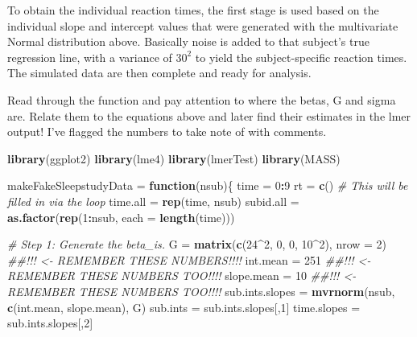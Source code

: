\documentclass[
]{book}
\newenvironment{Shaded}{\begin{snugshade}}{\end{snugshade}}
\newcommand{\CommentTok}[1]{\textcolor[rgb]{0.56,0.35,0.01}{\textit{#1}}}
\newcommand{\ControlFlowTok}[1]{\textcolor[rgb]{0.13,0.29,0.53}{\textbf{#1}}}
\newcommand{\DataTypeTok}[1]{\textcolor[rgb]{0.13,0.29,0.53}{#1}}
\newcommand{\DecValTok}[1]{\textcolor[rgb]{0.00,0.00,0.81}{#1}}
\newcommand{\KeywordTok}[1]{\textcolor[rgb]{0.13,0.29,0.53}{\textbf{#1}}}
\newcommand{\NormalTok}[1]{#1}
\newcommand{\OperatorTok}[1]{\textcolor[rgb]{0.81,0.36,0.00}{\textbf{#1}}}
\newcommand{\StringTok}[1]{\textcolor[rgb]{0.31,0.60,0.02}{#1}}
\begin{document}
To obtain the individual reaction times, the first stage is used based on the individual slope and intercept values that were generated with the multivariate Normal distribution above. Basically noise is added to that subject's true regression line, with a variance of \(30^2\) to yield the subject-specific reaction times. The simulated data are then complete and ready for analysis.

Read through the function and pay attention to where the betas, G and sigma are. Relate them to the equations above and later find their estimates in the lmer output! I've flagged the numbers to take note of with comments.

\begin{Shaded}
\begin{Highlighting}[]
\KeywordTok{library}\NormalTok{(ggplot2)}
\KeywordTok{library}\NormalTok{(lme4)}
\KeywordTok{library}\NormalTok{(lmerTest)}
\KeywordTok{library}\NormalTok{(MASS)}

\NormalTok{makeFakeSleepstudyData =}\StringTok{ }\ControlFlowTok{function}\NormalTok{(nsub)\{}
\NormalTok{  time =}\StringTok{ }\DecValTok{0}\OperatorTok{:}\DecValTok{9}
\NormalTok{  rt =}\StringTok{ }\KeywordTok{c}\NormalTok{() }\CommentTok{\# This will be filled in via the loop}
\NormalTok{  time.all =}\StringTok{ }\KeywordTok{rep}\NormalTok{(time, nsub)}
\NormalTok{  subid.all =}\StringTok{ }\KeywordTok{as.factor}\NormalTok{(}\KeywordTok{rep}\NormalTok{(}\DecValTok{1}\OperatorTok{:}\NormalTok{nsub, }\DataTypeTok{each =} \KeywordTok{length}\NormalTok{(time)))}
  
  \CommentTok{\# Step 1:  Generate the beta\_i\textquotesingle{}s.  }
\NormalTok{  G =}\StringTok{ }\KeywordTok{matrix}\NormalTok{(}\KeywordTok{c}\NormalTok{(}\DecValTok{24}\OperatorTok{\^{}}\DecValTok{2}\NormalTok{, }\DecValTok{0}\NormalTok{, }\DecValTok{0}\NormalTok{, }\DecValTok{10}\OperatorTok{\^{}}\DecValTok{2}\NormalTok{), }\DataTypeTok{nrow =} \DecValTok{2}\NormalTok{)   }\CommentTok{\#\#!!! <{-} REMEMBER THESE NUMBERS!!!!}
\NormalTok{  int.mean =}\StringTok{ }\DecValTok{251}  \CommentTok{\#\#!!! <{-} REMEMBER THESE NUMBERS TOO!!!!}
\NormalTok{  slope.mean =}\StringTok{ }\DecValTok{10}  \CommentTok{\#\#!!! <{-} REMEMBER THESE NUMBERS TOO!!!!}
\NormalTok{  sub.ints.slopes =}\StringTok{ }\KeywordTok{mvrnorm}\NormalTok{(nsub, }\KeywordTok{c}\NormalTok{(int.mean, slope.mean), G)}
\NormalTok{  sub.ints =}\StringTok{ }\NormalTok{sub.ints.slopes[,}\DecValTok{1}\NormalTok{]}
\NormalTok{  time.slopes =}\StringTok{ }\NormalTok{sub.ints.slopes[,}\DecValTok{2}\NormalTok{]}
  

\end{Highlighting}
\end{Shaded}
\end{document}
